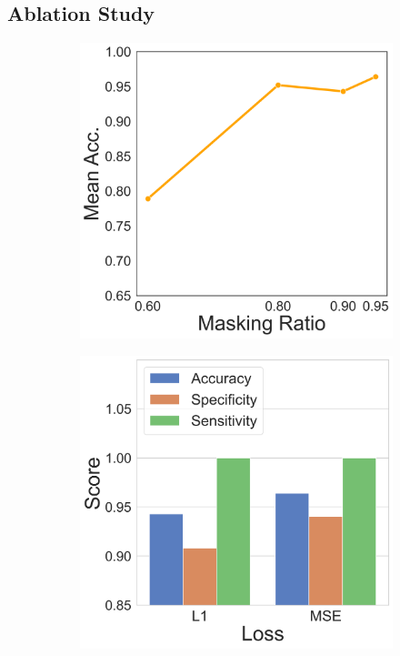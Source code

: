 \subsection{Ablation Study}
\begin{figure}[!t]
	\centering
	\begin{subfigure}[b]{0.23\linewidth}
        \centering
        \includegraphics[width=\linewidth]{figs/focusmae/abl_mr.png}
        \caption{}
        \label{focusmae_fig:ablation_mr}
    \end{subfigure}
	\begin{subfigure}[b]{0.23\linewidth}
		\centering
		\includegraphics[width=\linewidth]{figs/focusmae/abl_loss.png}

\end{subfigure}
\end{figure}
